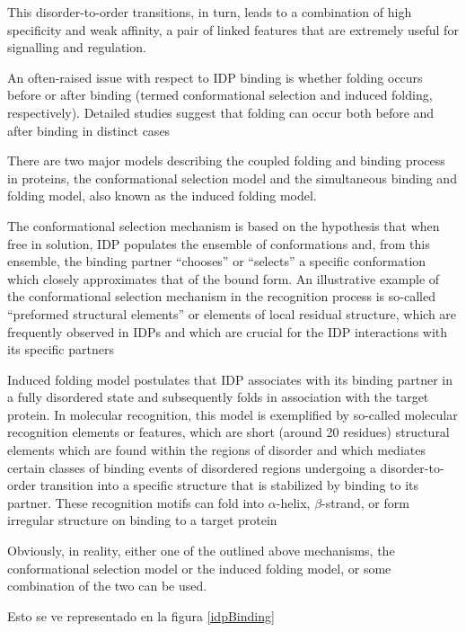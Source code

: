 This disorder-to-order transitions, in turn, leads to a combination of high specificity and weak affinity, a pair of linked features that are extremely useful for signalling and regulation.

An often-raised issue with respect to IDP binding is whether folding occurs before or after binding (termed conformational selection and induced folding, respectively).
Detailed studies suggest that folding can occur both before and after binding in distinct cases


There are two major models describing the coupled folding and binding process in proteins, the conformational selection model and the simultaneous binding and folding model, also known as the induced folding model.

The conformational selection mechanism is based on the hypothesis that when free in solution, IDP populates the ensemble of conformations and, from this ensemble, the binding partner “chooses” or
“selects” a specific conformation which closely approximates that of the bound form. An illustrative example of the conformational selection mechanism in the recognition process is
so-called “preformed structural elements” or elements of local residual structure, which are frequently observed in IDPs and which are crucial for the IDP interactions with its specific
partners

Induced folding model postulates that IDP associates with its binding partner in a fully disordered state and subsequently folds in association with the target protein. 
In molecular recognition, this model is exemplified by so-called molecular recognition elements or features, which are short (around 20 residues) structural elements which are found 
within the regions of disorder and which mediates certain classes of binding
events of disordered regions undergoing a disorder-to-order transition into a specific structure that is stabilized by binding to its partner.
These recognition motifs can fold into $\alpha$-helix, $\beta$-strand, or form irregular structure on binding to a target protein

Obviously, in reality, either one of the outlined above mechanisms, the conformational selection model or the induced folding model, or some combination of the two can be used.

Esto se ve representado en la figura \ref{idpBinding}



